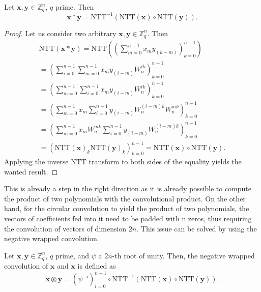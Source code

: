 \begin{theorem}
Let $\mathbf{x},\mathbf{y}\in\mathbb{Z}_q^n$, $q$ prime. Then
\begin{equation*}
\mathbf{x}\ast\mathbf{y} = \mathrm{NTT}^{-1}(\mathrm{NTT}(\mathbf{x}) \circ \mathrm{NTT}(\mathbf{y})).
\end{equation*}
\end{theorem}
\begin{proof}
Let us consider two arbitrary $\mathbf{x},\mathbf{y}\in\mathbb{Z}_q^n$. Then
\begin{equation*}
\begin{aligned}
\mathrm{NTT}(\mathbf{x}\ast\mathbf{y}) = \mathrm{NTT}\left(\left(\sum_{m=0}^{n-1}x_{m}y_{(k-m)}\right)_{k=0}^{n-1}\right)\\
= \left(\sum_{i=0}^{n-1}\sum_{m=0}^{n-1}x_my_{(i-m)}W_n^{ik}\right)_{k=0}^{n-1}\\
= \left(\sum_{m=0}^{n-1}\sum_{i=0}^{n-1}x_my_{(i-m)}W_n^{ik}\right)_{k=0}^{n-1}\\
= \left(\sum_{m=0}^{n-1}x_m\sum_{i=0}^{n-1}y_{(i-m)}W_n^{(i-m)k}W_n^{mk}\right)_{k=0}^{n-1}\\
= \left(\sum_{m=0}^{n-1}x_mW_n^{mk}\sum_{i=0}^{n-1}y_{(i-m)}W_n^{(i-m)k}\right)_{k=0}^{n-1}\\
= \left(\mathrm{NTT}(\mathbf{x})_k\mathrm{NTT}(\mathbf{y})_k\right)_{k=0}^{n-1} = \mathrm{NTT}(\mathbf{x})\circ \mathrm{NTT}(\mathbf{y}).
\end{aligned}
\end{equation*}
Applying the inverse NTT transform to both sides of the equality yields the wanted result.
\end{proof}

This is already a step in the right direction as it is already possible to compute the product of two polynomials with the convolutional product. On the other hand, for the circular convolution to yield the product of two polynomials, the vectors of coefficients fed into it need to be padded with n zeros, thus requiring the convolution of vectors of dimension $2n$. This issue can be solved by using the negative wrapped convolution.

\begin{definition}
Let $\mathbf{x},\mathbf{y}\in\mathbb{Z}_q^n$, $q$ prime, and $\psi$ a $2n$-th root of unity. Then, the negative wrapped convolution of $\mathbf{x}$ and $\mathbf{x}$ is defined as
\begin{equation*}
\mathbf{x}\circledast\mathbf{y} = (\psi^{-i})_{i=0}^{n-1}\circ \mathrm{NTT}^{-1}(\mathrm{NTT}(\mathbf{x})\circ \mathrm{NTT}(\mathbf{y})).
\end{equation*}
\end{definition}


